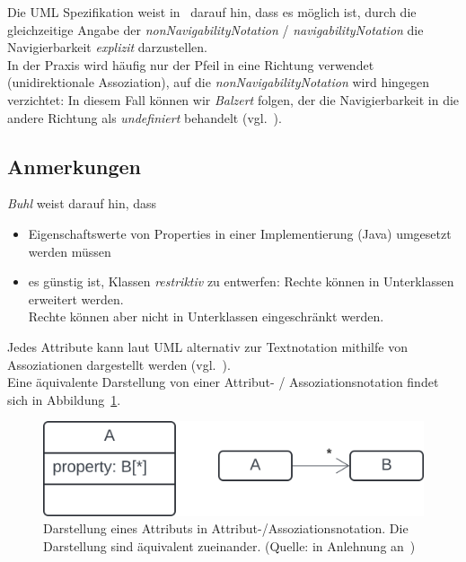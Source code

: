 \begin{tcolorbox}[title=Angabe der Navigierbarkeit,colback=white]
    Die UML Spezifikation weist in~\cite[203]{OMG17} darauf hin, dass es möglich ist, durch die gleichzeitige Angabe der \textit{nonNavigabilityNotation} / \textit{navigabilityNotation} die Navigierbarkeit \textit{explizit} darzustellen.\\
    In der Praxis wird häufig nur der Pfeil in eine Richtung verwendet (unidirektionale Assoziation), auf die \textit{nonNavigabilityNotation} wird hingegen verzichtet: In diesem Fall können wir \textit{Balzert} folgen, der die Navigierbarkeit in die andere Richtung als \textit{undefiniert} behandelt (vgl.~\cite[285]{Bal05}).
\end{tcolorbox}

\subsection*{Anmerkungen}
\textit{Buhl} weist darauf hin, dass

\begin{itemize}
    \item Eigenschaftswerte von Properties in einer Implementierung (Java) umgesetzt werden müssen
    \item es günstig ist, Klassen \textit{restriktiv} zu entwerfen: Rechte können in Unterklassen erweitert werden.\\
    Rechte können aber nicht in Unterklassen eingeschränkt werden.
\end{itemize}

\begin{tcolorbox}[title=Attribut- vs. Assoziationsnotation,colback=white]
    Jedes Attribute kann laut UML alternativ zur Textnotation mithilfe von Assoziationen dargestellt werden (vgl.~\cite[264]{Bal05}).\\
    Eine äquivalente Darstellung von einer Attribut- / Assoziationsnotation findet sich in Abbildung~\ref{fig:attassocequiv}.
\end{tcolorbox}


\begin{figure}
    \centering
    \includegraphics[scale=0.5]{part three/Klassendiagramme/img/attassocequiv}
    \caption{Darstellung eines Attributs in Attribut-/Assoziationsnotation. Die Darstellung sind äquivalent zueinander. (Quelle: in Anlehnung an~\cite[Abb. 6.2-4, 264]{Bal05})}
    \label{fig:attassocequiv}
\end{figure}


